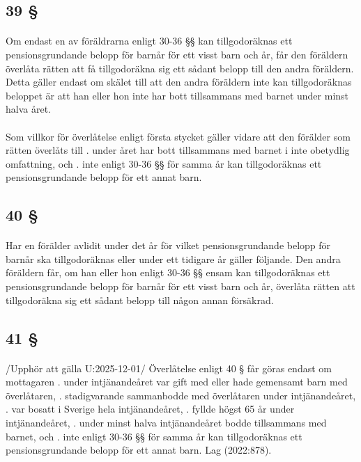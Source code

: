 \documentclass[a4paper,notitlepage,openany,10pt]{book}
\begin{document}
\subsection*{39 §}
\paragraph*{}
Om endast en av föräldrarna enligt 30-36 §§ kan tillgodoräknas ett pensionsgrundande belopp för barnår för ett visst barn och år, får den föräldern överlåta rätten att få tillgodoräkna sig ett sådant belopp till den andra föräldern. Detta gäller endast om skälet till att den andra föräldern inte kan tillgodoräknas beloppet är att han eller hon inte har bott tillsammans med barnet under minst halva året.
\paragraph*{}
Som villkor för överlåtelse enligt första stycket gäller vidare att den förälder som rätten överlåts till
. under året har bott tillsammans med barnet i inte obetydlig omfattning, och
. inte enligt 30-36 §§ för samma år kan tillgodoräknas ett pensionsgrundande belopp för ett annat barn.
\subsection*{40 §}
\paragraph*{}
Har en förälder avlidit under det år för vilket pensionsgrundande belopp för barnår ska tillgodoräknas eller under ett tidigare år gäller följande. Den andra föräldern får, om han eller hon enligt 30-36 §§ ensam kan tillgodoräknas ett pensionsgrundande belopp för barnår för ett visst barn och år, överlåta rätten att tillgodoräkna sig ett sådant belopp till någon annan försäkrad.
\subsection*{41 §}
\paragraph*{}
/Upphör att gälla U:2025-12-01/
Överlåtelse enligt 40 § får göras endast om mottagaren
. under intjänandeåret var gift med eller hade gemensamt barn med överlåtaren,
. stadigvarande sammanbodde med överlåtaren under intjänandeåret,
. var bosatt i Sverige hela intjänandeåret,
. fyllde högst 65 år under intjänandeåret,
. under minst halva intjänandeåret bodde tillsammans med barnet, och
. inte enligt 30-36 §§ för samma år kan tillgodoräknas ett pensionsgrundande belopp för ett annat barn.
Lag (2022:878).
\end{document}
